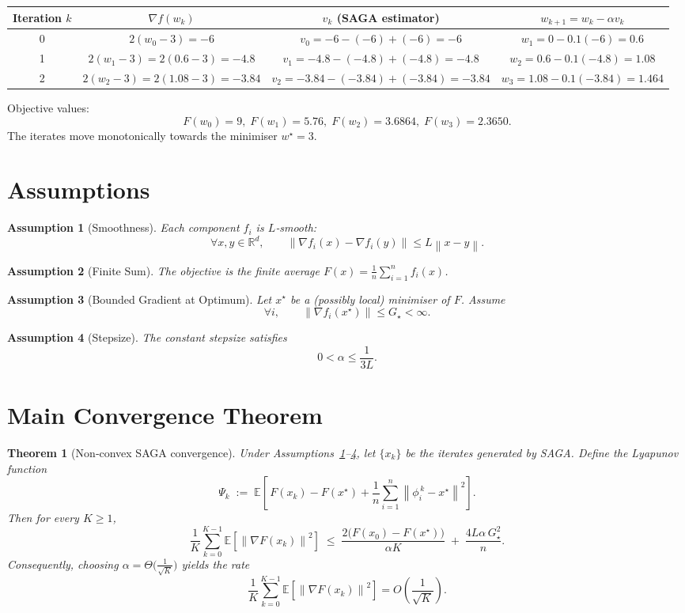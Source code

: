 \documentclass[11pt]{article}
\newtheorem{theorem}{Theorem}
\newtheorem{assumption}{Assumption}
\newcommand{\E}{\mathbb{E}}
\newcommand{\R}{\mathbb{R}}
\newcommand{\norm}[1]{\left\|#1\right\|}
\newcommand{\grad}{\nabla}
\begin{document}
\begin{center}
\begin{tabular}{c|c|c|c}
Iteration $k$ & $\grad f(w_k)$ & $v_k$ (SAGA estimator) & $w_{k+1}=w_k-\alpha v_k$\\ \hline
0 & $2(w_0-3)=-6$ & $v_0=-6-(-6)+(-6)=-6$ & $w_1=0-0.1(-6)=0.6$\\
1 & $2(w_1-3)=2(0.6-3)=-4.8$ & $v_1=-4.8-(-4.8)+(-4.8)=-4.8$ & $w_2=0.6-0.1(-4.8)=1.08$\\
2 & $2(w_2-3)=2(1.08-3)=-3.84$ & $v_2=-3.84-(-3.84)+(-3.84)=-3.84$ & $w_3=1.08-0.1(-3.84)=1.464$\\
\end{tabular}
\end{center}
Objective values:
\[
F(w_0)=9,\;F(w_1)=5.76,\;F(w_2)=3.6864,\;F(w_3)=2.3650.
\]
The iterates move monotonically towards the minimiser $w^\star=3$.

\newpage
\section*{Assumptions}
\begin{assumption}[Smoothness]\label{ass:smooth}
Each component $f_i$ is $L$‑smooth:
\[
\forall x,y\in\R^{d},\qquad 
\norm{\grad f_i(x)-\grad f_i(y)}\le L\norm{x-y}.
\tag{A1}
\]
\end{assumption}
\begin{assumption}[Finite Sum]\label{ass:finite}
The objective is the finite average $F(x)=\frac1n\sum_{i=1}^{n}f_i(x)$.
\end{assumption}
\begin{assumption}[Bounded Gradient at Optimum]\label{ass:opt}
Let $x^\star$ be a (possibly local) minimiser of $F$. Assume
\[
\forall i,\qquad \norm{\grad f_i(x^\star)}\le G_{\star}<\infty .
\tag{A3}
\]
\end{assumption}
\begin{assumption}[Stepsize]\label{ass:stepsize}
The constant stepsize satisfies
\[
0<\alpha\le \frac{1}{3L}.
\tag{A4}
\]
\end{assumption}

\section*{Main Convergence Theorem}
\begin{theorem}[Non‑convex SAGA convergence]\label{thm:main}
Under Assumptions~\ref{ass:smooth}–\ref{ass:stepsize}, let $\{x_k\}$ be the iterates generated by SAGA. Define the Lyapunov function
\[
\Psi_k \;:=\; \E\!\left[\,F(x_k)-F(x^\star)
   +\frac{1}{n}\sum_{i=1}^{n}\norm{\phi_i^{\,k}-x^\star}^{2}\right].
\tag{4}
\]
Then for every $K\ge 1$,
\[
\frac{1}{K}\sum_{k=0}^{K-1}\E\!\left[\norm{\grad F(x_k)}^{2}\right]
\;\le\;
\frac{2\bigl(F(x_0)-F(x^\star)\bigr)}{\alpha K}
\;+\;
\frac{4L\alpha\,G_{\star}^{2}}{n}.
\tag{5}
\]
Consequently, choosing $\alpha = \Theta\!\bigl(\tfrac{1}{\sqrt{K}}\bigr)$ yields the rate
\[
\frac{1}{K}\sum_{k=0}^{K-1}\E\!\left[\norm{\grad F(x_k)}^{2}\right]
=O\!\left(\frac{1}{\sqrt{K}}\right).
\]
\end{theorem}
\end{document}
